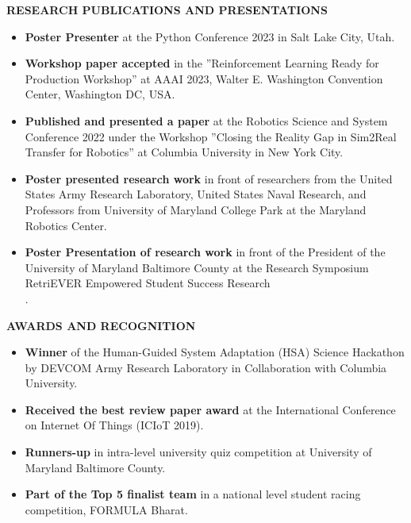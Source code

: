 \documentclass{article}
\begin{document}
\noindent \textbf{RESEARCH PUBLICATIONS AND PRESENTATIONS}
\begin{itemize}[noitemsep,nolistsep,leftmargin=*]
    \item \textbf{Poster Presenter} at the Python Conference 2023 in Salt Lake City, Utah.
    \item \textbf{Workshop paper accepted} in the ”Reinforcement Learning Ready for Production Workshop” at AAAI 2023, Walter E. Washington Convention Center, Washington DC, USA.
    \item \textbf{Published and presented a paper} at the Robotics Science and System Conference 2022 under the Workshop ”Closing the Reality Gap in Sim2Real Transfer for Robotics” at Columbia University in New York City.
    \item \textbf{Poster presented research work} in front of researchers from the United States Army Research Laboratory, United States Naval Research, and Professors from University of Maryland College Park at the Maryland Robotics Center.
    \item \textbf{Poster Presentation of research work} in front of the President of the University of Maryland Baltimore County at the Research Symposium RetriEVER Empowered Student Success Research\\.
\end{itemize}

\noindent \textbf{AWARDS AND RECOGNITION}
\begin{itemize}[noitemsep,nolistsep,leftmargin=*]
    \item \textbf{Winner} of the Human-Guided System Adaptation (HSA) Science Hackathon by DEVCOM Army Research Laboratory in Collaboration with Columbia University.
    \item \textbf{Received the best review paper award} at the International Conference on Internet Of Things (ICIoT 2019).
    \item \textbf{Runners-up} in intra-level university quiz competition at University of Maryland Baltimore County.
    \item \textbf{Part of the Top 5 finalist team} in a national level student racing competition, FORMULA Bharat.
\end{itemize}



\end{document}
